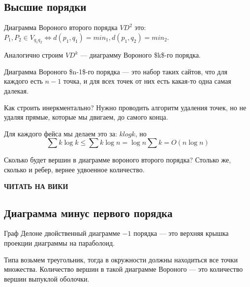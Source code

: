 \documentclass[11pt]{article}
\begin{document}
\subsection{Высшие порядки}
\label{sec:orgheadline56}
Диаграмма Вороного второго порядка \(VD^2\) это: \(P_1, P_2 \in
   V_{q_1q_2} \Leftrightarrow d(p_1, q_1) = min_1, d(p_1,q_2) = min_2\).

Аналогично строим \(VD^k\) --- диаграмму Вороного \$k\$-го порядка.

Диаграмма Вороного \$n-1\$-го порядка --- это набор таких сайтов, что
для каждого есть \(n-1\) точка, и для всех точек от них есть какая-то
одна самая далекая.

Как строить инеркментально? Нужно проводить алгоритм удаления
точек, но не удаляя прямые, которые мы двигаем, до самого конца.

Для каждого фейса мы делаем это за: \(klogk\), но \[\sum{k\log{k}}
   \le \sum{k\log{n}} = \log{n}\sum{k} = O(n\log{n})\]

Сколько будет вершин в диаграмме вороного второго порядка? Столько
же, сколько и ребер, вернее удвоенное количество.

\textbf{ЧИТАТЬ НА ВИКИ}
\subsection{Диаграмма минус первого порядка}
\label{sec:orgheadline57}
Граф Делоне двойственный диаграмме \(-1\) порядка --- это верхняя крышка
проекции диаграммы на параболоид.

Типа возьмем треугольник, тогда в окружности должны находиться все
точки множества. Количество вершин в такой диаграмме Вороного ---
это количество вершин выпуклой оболочки.
\end{document}
